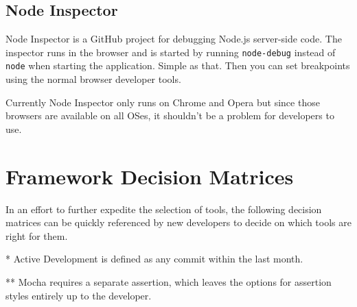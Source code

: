 \documentclass[12pt]{ucthesis}
\begin{document}
\subsection{Node Inspector}
Node Inspector\cite{NodeInspector} is a GitHub project for debugging Node.js server-side code. The inspector runs in the browser and is started by running \lstinline{node-debug} instead of \lstinline{node} when starting the application. Simple as that. Then you can set breakpoints using the normal browser developer tools.

Currently Node Inspector only runs on Chrome and Opera but since those browsers are available on all OSes, it shouldn't be a problem for developers to use.

\section{Framework Decision Matrices}
In an effort to further expedite the selection of tools, the following decision matrices can be quickly referenced by new developers to decide on which tools are right for them.

\FloatBarrier
\begin{table}[ht]
\end{table}
\FloatBarrier
\footnotesize

* Active Development is defined as any commit within the last month.

** Mocha requires a separate assertion, which leaves the options for assertion styles entirely up to the developer.
\end{document}
